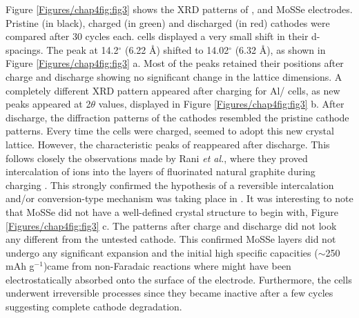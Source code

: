 Figure \ref{Figures/chap4fig:fig3} shows the XRD patterns of ,  and MoSSe electrodes. Pristine (in black), charged (in green) and discharged (in red) cathodes were compared after 30 cycles each.  cells displayed a very small shift in their d-spacings. The peak at 14.2$^{\circ}$ (6.22 \AA) shifted to 14.02$^{\circ}$ (6.32 \AA), as shown in Figure \ref{Figures/chap4fig:fig3} a. Most of the peaks retained their positions after charge and discharge showing no significant change in the lattice dimensions. A completely different XRD pattern appeared after charging for Al/ cells, as new peaks appeared at 2$\theta$ values, displayed in Figure \ref{Figures/chap4fig:fig3} b. After discharge, the diffraction patterns of the cathodes resembled the pristine cathode patterns. Every time the cells were charged,  seemed to adopt this new crystal lattice. However, the characteristic peaks of  reappeared after discharge. This follows closely the observations made by Rani \textit{et al.}, where they proved intercalation of ions into the layers of fluorinated natural graphite during charging \cite{rani_fluorinated_2013}. This strongly confirmed the hypothesis of a reversible intercalation and/or conversion-type mechanism was taking place in . It was interesting to note that MoSSe did not have a well-defined crystal structure to begin with, Figure \ref{Figures/chap4fig:fig3} c. The patterns after charge and discharge did not look any different from the untested cathode. This confirmed MoSSe layers did not undergo any significant expansion and the initial high specific capacities ($\sim$250 mAh g$^{-1}$)came from non-Faradaic reactions where  might have been electrostatically absorbed onto the surface of the electrode. Furthermore, the cells underwent irreversible processes since they became inactive after a few cycles suggesting complete cathode degradation. 
